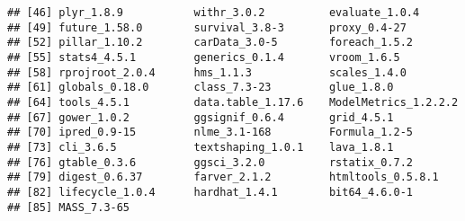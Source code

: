 \documentclass[
]{article}
\begin{document}
\begin{verbatim}
## [46] plyr_1.8.9           withr_3.0.2          evaluate_1.0.4      
## [49] future_1.58.0        survival_3.8-3       proxy_0.4-27        
## [52] pillar_1.10.2        carData_3.0-5        foreach_1.5.2       
## [55] stats4_4.5.1         generics_0.1.4       vroom_1.6.5         
## [58] rprojroot_2.0.4      hms_1.1.3            scales_1.4.0        
## [61] globals_0.18.0       class_7.3-23         glue_1.8.0          
## [64] tools_4.5.1          data.table_1.17.6    ModelMetrics_1.2.2.2
## [67] gower_1.0.2          ggsignif_0.6.4       grid_4.5.1          
## [70] ipred_0.9-15         nlme_3.1-168         Formula_1.2-5       
## [73] cli_3.6.5            textshaping_1.0.1    lava_1.8.1          
## [76] gtable_0.3.6         ggsci_3.2.0          rstatix_0.7.2       
## [79] digest_0.6.37        farver_2.1.2         htmltools_0.5.8.1   
## [82] lifecycle_1.0.4      hardhat_1.4.1        bit64_4.6.0-1       
## [85] MASS_7.3-65
\end{verbatim}
\end{document}
